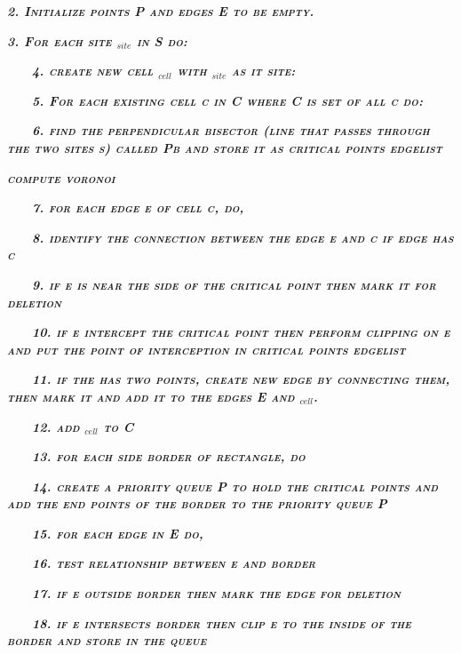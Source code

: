 \documentclass[11pt,a4paper]{article}
\begin{document}
\textbf{\textit{\textsc{\textsc{2. Initialize points P and edges E
to be empty.}}}}

\textbf{\textit{\textsc{\textsc{3. For each site $_{site}$ in S
do:}}}}

\ \ \ \ \textbf{\textit{\textsc{\textsc{4. create new cell $_{cell
}$ with $_{site}$ as it site:}}}}

\ \ \ \ \textbf{\textit{\textsc{\textsc{5. For each existing cell c
in C where C is set of all c do:}}}}

\ \ \ \ \textbf{\textit{\textsc{\textsc{6. find the perpendicular
bisector (line that passes through the two sites s) called Pb and store
it as critical points edgelist}}}}

\textbf{\textit{\textsc{\textsc{compute voronoi}}}}

\ \ \ \ \textbf{\textit{\textsc{\textsc{7. for each edge e of cell
c, do,}}}}

\ \ \ \ \textbf{\textit{\textsc{\textsc{8. identify the connection
between the edge e and c if edge has c}}}}

\ \ \ \ \textbf{\textit{\textsc{\textsc{9. if e is near the side of
the critical point then mark it for deletion}}}}

\ \ \ \ \textbf{\textit{\textsc{\textsc{10. if e intercept the
critical point then perform clipping on e and put the point of
interception in critical points edgelist}}}}

\ \ \ \ \textbf{\textit{\textsc{\textsc{11. if the has two points,
create new edge by connecting them, then mark it and add it to the edges
E and $_{cell}$.}}}}

\ \ \ \ \textbf{\textit{\textsc{\textsc{12. add $_{cell}$ to C}}
}}

\ \ \ \ \textbf{\textit{\textsc{\textsc{13. for each side border of
rectangle, do}}}}

\ \ \ \ \textbf{\textit{\textsc{\textsc{14. create a priority queue
P to hold the critical points and add the end points of the border to
the priority queue P}}}}

\ \ \ \ \textbf{\textit{\textsc{\textsc{15. for each edge in E do,}
}}}

\ \ \ \ \textbf{\textit{\textsc{\textsc{16. test relationship
between e and border}}}}

\ \ \ \ \textbf{\textit{\textsc{\textsc{17. if e outside border then
mark the edge for deletion}}}}

\ \ \ \ \textbf{\textit{\textsc{\textsc{18. if e intersects border
then clip e to the inside of the border and store in the queue}}}}
\end{document}
